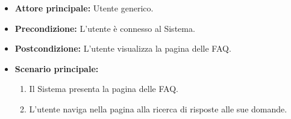 \begin{acronym}
\end{acronym}

\label{usecase:Visualizzazione FAQ}
\begin{itemize}
	\item \textbf{Attore principale:} Utente generico.


	\item \textbf{Precondizione:}
	      L'utente è connesso al Sistema.

	\item \textbf{Postcondizione:} L'utente visualizza la pagina delle \ac{FAQ}.

	\item \textbf{Scenario principale:}
	      \begin{enumerate}
              \item Il Sistema presenta la pagina delle \ac{FAQ}.
              \item L'utente naviga nella pagina alla ricerca di risposte alle sue domande.
		    
	      \end{enumerate}
\end{itemize}